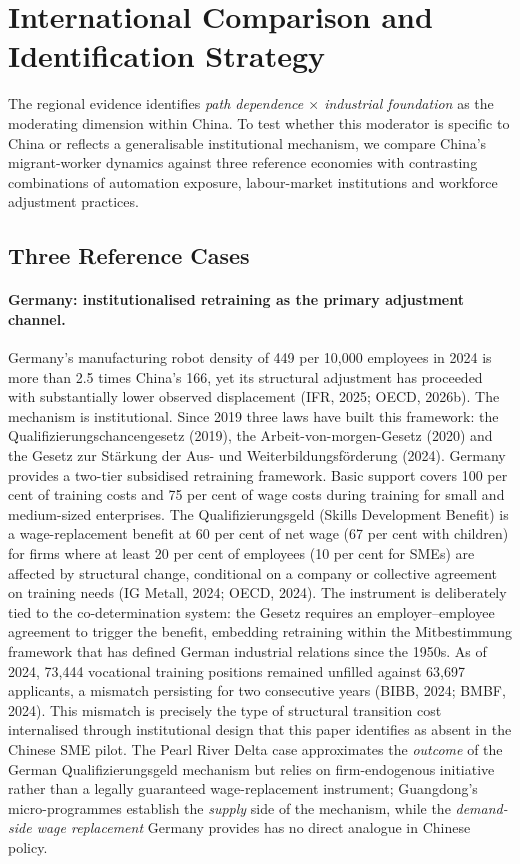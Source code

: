 \documentclass[12pt]{article}
\begin{document}
\section{International Comparison and Identification Strategy}

The regional evidence identifies \emph{path dependence $\times$ industrial foundation} as the moderating dimension within China. To test whether this moderator is specific to China or reflects a generalisable institutional mechanism, we compare China's migrant-worker dynamics against three reference economies with contrasting combinations of automation exposure, labour-market institutions and workforce adjustment practices.

\subsection{Three Reference Cases}

\paragraph{Germany: institutionalised retraining as the primary adjustment channel.} Germany's manufacturing robot density of 449 per 10,000 employees in 2024 is more than 2.5 times China's 166, yet its structural adjustment has proceeded with substantially lower observed displacement (IFR, 2025; OECD, 2026b). The mechanism is institutional. Since 2019 three laws have built this framework: the Qualifizierungschancengesetz (2019), the Arbeit-von-morgen-Gesetz (2020) and the Gesetz zur St\"arkung der Aus- und Weiterbildungsf\"orderung (2024). Germany provides a two-tier subsidised retraining framework. Basic support covers 100 per cent of training costs and 75 per cent of wage costs during training for small and medium-sized enterprises. The Qualifizierungsgeld (Skills Development Benefit) is a wage-replacement benefit at 60 per cent of net wage (67 per cent with children) for firms where at least 20 per cent of employees (10 per cent for SMEs) are affected by structural change, conditional on a company or collective agreement on training needs (IG Metall, 2024; OECD, 2024). The instrument is deliberately tied to the co-determination system: the Gesetz requires an employer--employee agreement to trigger the benefit, embedding retraining within the Mitbestimmung framework that has defined German industrial relations since the 1950s. As of 2024, 73,444 vocational training positions remained unfilled against 63,697 applicants, a mismatch persisting for two consecutive years (BIBB, 2024; BMBF, 2024). This mismatch is precisely the type of structural transition cost internalised through institutional design that this paper identifies as absent in the Chinese SME pilot. The Pearl River Delta case approximates the \emph{outcome} of the German Qualifizierungsgeld mechanism but relies on firm-endogenous initiative rather than a legally guaranteed wage-replacement instrument; Guangdong's micro-programmes establish the \emph{supply} side of the mechanism, while the \emph{demand-side wage replacement} Germany provides has no direct analogue in Chinese policy.
\end{document}
